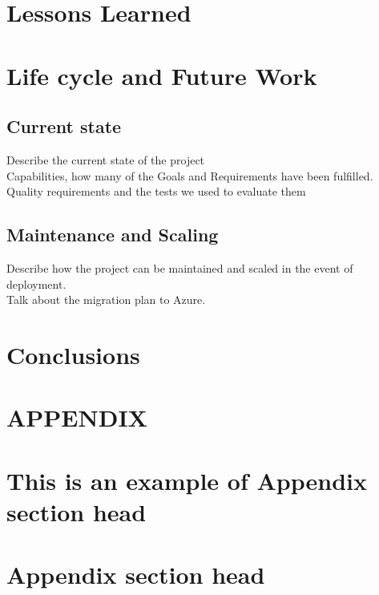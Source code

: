 \documentclass[prodmode,acmtecs]{acmsmall} %
\begin{document}
\section{Lessons Learned} %

\section{Life cycle and Future Work}
\subsection{Current state}
Describe the current state of the project\\
Capabilities, how many of the Goals and Requirements have been fulfilled.\\
Quality requirements and the tests we used to evaluate them\\

\subsection{Maintenance and Scaling}
Describe how the project can be maintained and scaled in the event of deployment.\\
Talk about the migration plan to Azure.\\

\section{Conclusions}


\appendix
\section*{APPENDIX}
\setcounter{section}{1}


\begin{acks}
\end{acks}  





\elecappendix

\medskip

\section{This is an example of Appendix section head}


\section{Appendix section head}
\end{document}
